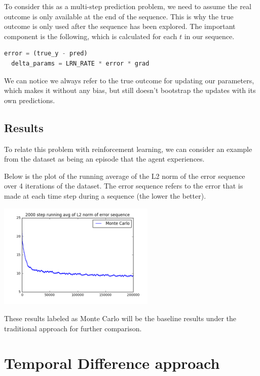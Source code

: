 \documentclass{article}
\begin{document}
To consider this as a multi-step prediction problem, we need to assume the real outcome is only available at the end of the sequence. This is why the true outcome is only used after the sequence has been explored. The important component is the following, which is calculated for each $t$ in our sequence.

\begin{lstlisting}[language=Python]
  error = (true_y - pred)
  delta_params = LRN_RATE * error * grad
\end{lstlisting}

We can notice we always refer to the true outcome for updating our parameters, which makes it without any bias, but still doesn't bootstrap the updates with its own predictions.

\subsection{Results}

To relate this problem with reinforcement learning, we can consider an example from the dataset as being an episode that the agent experiences.

Below is the plot of the running average of the L2 norm of the error sequence over 4 iterations of the dataset. The error sequence refers to the error that is made at each time step during a sequence (the lower the better).

\begin{center}
  \includegraphics[width=75mm]{figures/plot_MC_L2_norm_error.png}
\end{center}

These results labeled as Monte Carlo will be the baseline results under the traditional approach for further comparison.

\section{Temporal Difference approach}
\end{document}
